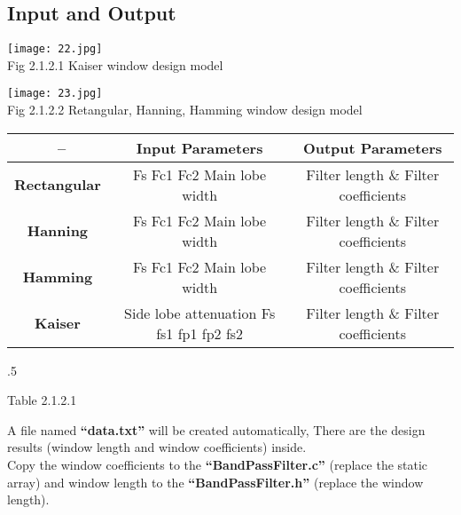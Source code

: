 \documentclass[12pt]{report}
\begin{document}
\subsection{Input and Output}
\begin{center}
\texttt{[image: 22.jpg]}\\
\textup{\footnotesize Fig 2.1.2.1 Kaiser window design model}
\end{center}
\begin{center}
\texttt{[image: 23.jpg]}\\
\textup{\footnotesize Fig 2.1.2.2 Retangular, Hanning, Hamming window design model}
\end{center}
  \begin{center}
    \begin{tabular}{||c|c|c||} \hline
      \ -- & Input Parameters & Output Parameters\\ \hline
      \textbf{Rectangular} & Fs Fc1 Fc2 Main lobe width & Filter length \& Filter coefficients\\ \hline
      \textbf{Hanning} & Fs Fc1 Fc2 Main lobe width & Filter length \& Filter coefficients\\ \hline
      \textbf{Hamming} & Fs Fc1 Fc2 Main lobe width & Filter length \& Filter coefficients\\ \hline
      \textbf{Kaiser} & Side lobe attenuation Fs fs1 fp1 fp2 fs2 & Filter length \& Filter coefficients\\ \hline
    \end{tabular}
  \end{center}
  \moveleft.5\hoffset\centerline{\footnotesize Table 2.1.2.1}
\vspace{3pt}
A file named \textbf{``data.txt''} will be created automatically, There are the design results (window length and window coefficients) inside.\\Copy the window coefficients to the \textbf{``BandPassFilter.c''} (replace the static array) and window length to the \textbf{``BandPassFilter.h''} (replace the window length).
\end{document}
